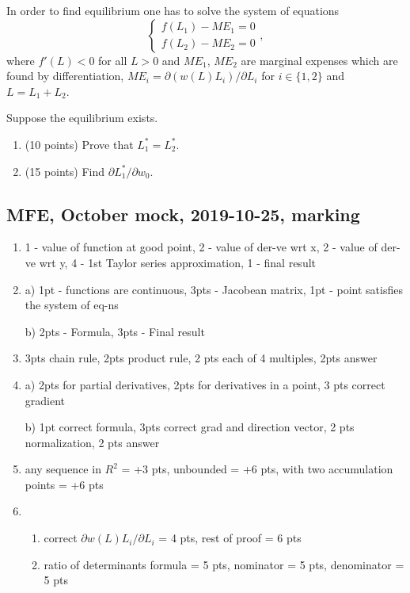 \begin{enumerate}
  In order to find equilibrium one has to solve the system of equations
  \[
  \begin{cases}
    f(L_1) - ME_1 = 0 \\
    f(L_2) - ME_2 = 0
  \end{cases},
  \]
  where $f'(L)<0$ for all $L>0$ 
  and $ME_1$, $ME_2$ are marginal expenses which are found by differentiation, 
  $ME_i = \partial (w(L)L_i)/\partial L_i$ for $i \in \{1, 2\}$ and $L = L_1 + L_2$. 
  
  Suppose the equilibrium exists.
  \begin{enumerate}
    \item (10 points) Prove that $L_1^*=L_2^*$.
    \item (15 points) Find $\partial L_1^*/\partial w_0$.
  \end{enumerate}
  
  \end{enumerate}
  

\subsection{MFE, October mock, 2019-10-25, marking}


\begin{enumerate}
  \item 1 - value of function at good point,
  2 - value of der-ve wrt x,
  2 - value of der-ve wrt y,
  4 - 1st Taylor series approximation,
  1 - final result
  
  \item 
  a) 1pt - functions are continuous, 3pts - Jacobean matrix, 1pt - point satisfies the system of eq-ns
  
  
  b) 2pts - Formula, 3pts - Final result
  
  \item 3pts chain rule, 2pts product rule, 2 pts each of 4 multiples, 2pts answer
  
  \item
  a) 2pts for partial derivatives, 2pts for derivatives in a point, 3 pts correct gradient
  
  b) 1pt correct formula, 3pts correct grad and direction vector, 2 pts normalization, 2 pts answer
  
  \item  any sequence in $R^2$ = +3 pts,
  unbounded = +6 pts,
  with two accumulation points = +6 pts

  \item
  \begin{enumerate}
\item correct $\partial w(L)L_i /\partial L_i$ = 4 pts, rest of proof = 6 pts
 \item   ratio of determinants formula = 5 pts, nominator = 5 pts, denominator = 5 pts
  
\end{enumerate}
  

\end{enumerate}



